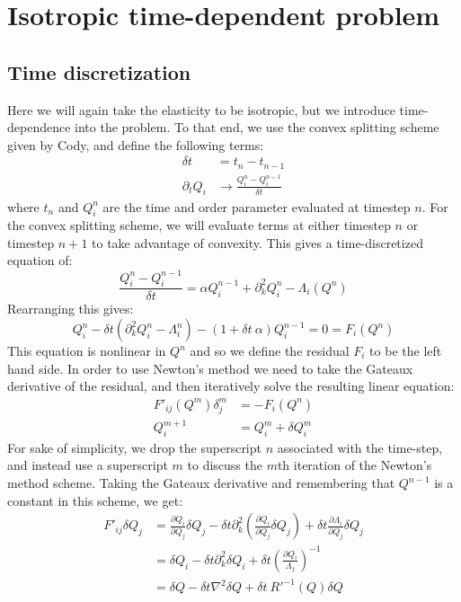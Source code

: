 \documentclass[reqno]{article}
\begin{document}
  \section{Isotropic time-dependent problem}
  \subsection{Time discretization}
  Here we will again take the elasticity to be isotropic, but we introduce
  time-dependence into the problem.
  To that end, we use the convex splitting scheme given by Cody, and define the
  following terms:
  \begin{align}
    \delta t &= t_n - t_{n - 1} \\
    \partial_t Q_i &\to \frac{Q^n_i - Q^{n - 1}_i}{\delta t}
  \end{align}
  where $t_n$ and $Q_i^n$ are the time and order parameter evaluated at timestep
  $n$.
  For the convex splitting scheme, we will evaluate terms at either timestep $n$
  or timestep $n + 1$ to take advantage of convexity.
  This gives a time-discretized equation of:
  \begin{equation}
    \frac{Q^n_i - Q^{n - 1}_i}{\delta t}
    = \alpha Q^{n - 1}_i
    + \partial_k^2 Q_i^n
    - \Lambda_i (Q^n)
  \end{equation}
  Rearranging this gives:
  \begin{equation}
    Q^n_i - \delta t\left( \partial_k^2 Q_i^n - \Lambda_i^n \right) 
    - (1 + \delta t \: \alpha) Q^{n - 1}_i 
    = 0
    = F_i(Q^n)
  \end{equation}
  This equation is nonlinear in $Q^n$ and so we define the residual $F_i$ to be the
  left hand side.
  In order to use Newton's method we need to take the Gateaux derivative of the
  residual, and then iteratively solve the resulting linear equation:
  \begin{align}
    F'_{ij}(Q^m) \delta^m_j &= -F_i(Q^n) \\
    Q^{m + 1}_i &= Q^m_i + \delta Q^m_i
  \end{align}
  For sake of simplicity, we drop the superscript $n$ associated with the
  time-step, and instead use a superscript $m$ to discuss the $m$th iteration of
  the Newton's method scheme.
  Taking the Gateaux derivative and remembering that $Q^{n - 1}$ is a constant
  in this scheme, we get:
  \begin{equation}
  \begin{split}
    F'_{ij} \delta Q_{j}
    &= \frac{\partial Q_i}{\partial Q_j} \delta Q_j
    - \delta t \partial_k^2 \left( \frac{\partial Q_i}{\partial Q_j} \delta Q_j \right)
    + \delta t \frac{\partial \Lambda_i}{\partial Q_j} \delta Q_j \\
    &= \delta Q_i
    - \delta t \partial_k^2 \delta Q_i
    + \delta t \left( \frac{\partial Q_i}{\Lambda_j} \right)^{-1} \\
    &= \delta Q
    - \delta t \nabla^2 \delta Q
    + \delta t \: R'^{-1}(Q) \delta Q
  \end{split}
  \end{equation}
\end{document}
